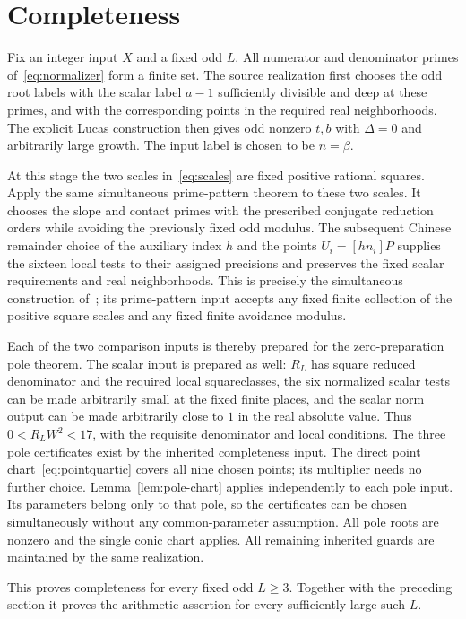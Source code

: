 \documentclass[11pt,a4paper]{article}
\begin{document}
\section{Completeness}

Fix an integer input $X$ and a fixed odd $L$. All numerator
and denominator primes of~\eqref{eq:normalizer} form a finite
set. The source realization first chooses the odd root labels
with the scalar label $a-1$ sufficiently divisible and deep at
these primes, and with the corresponding points in the required
real neighborhoods. The explicit Lucas construction then gives
odd nonzero $t,b$ with $\Delta=0$ and arbitrarily large
growth. The input label is chosen to be $n=\beta$.

At this stage the two scales in~\eqref{eq:scales} are fixed
positive rational squares. Apply the same simultaneous
prime-pattern theorem to these two scales. It chooses the slope
and contact primes with the prescribed conjugate reduction
orders while avoiding the previously fixed odd modulus. The
subsequent Chinese remainder choice of the auxiliary index $h$
and the points $U_i=[hn_i]P$ supplies the sixteen local tests
to their assigned precisions and preserves the fixed scalar
requirements and real neighborhoods. This is precisely the
simultaneous construction of~\cite{Dependencies,Baseline}; its
prime-pattern input accepts any fixed finite collection of the
positive square scales and any fixed finite avoidance modulus.

Each of the two comparison inputs is thereby prepared for the
zero-preparation pole theorem. The scalar input is prepared as
well: $R_L$ has square reduced denominator and the required
local squareclasses, the six normalized scalar tests can be made
arbitrarily small at the fixed finite places, and the scalar
norm output can be made arbitrarily close to $1$ in the real
absolute value. Thus $0<R_LW^2<17$, with the requisite
denominator and local conditions. The three pole certificates
exist by the inherited completeness input. The direct point chart~\eqref{eq:pointquartic} covers all nine
chosen points; its multiplier needs no further choice.
Lemma~\ref{lem:pole-chart} applies independently to each pole input.
Its parameters belong only to that pole, so the certificates can
be chosen simultaneously without any common-parameter assumption.
All pole roots are nonzero and the single conic chart applies.
All remaining inherited guards are maintained by the same realization.

This proves completeness for every fixed odd $L\ge3$.
Together with the preceding section it proves the arithmetic
assertion for every sufficiently large such $L$.
\end{document}
